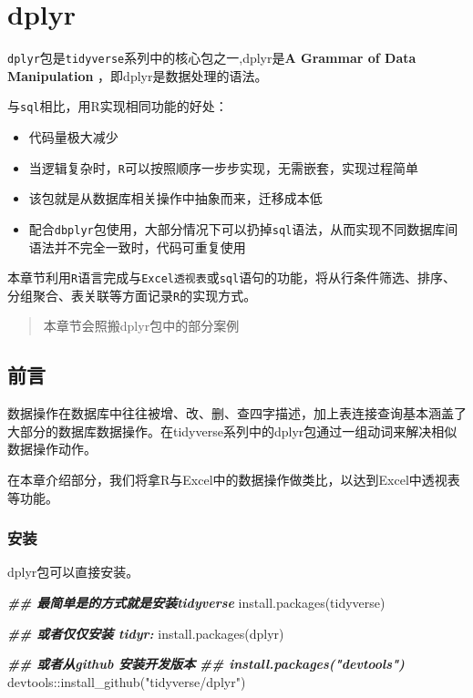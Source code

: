 \documentclass[
]{book}
\newenvironment{Shaded}{\begin{snugshade}}{\end{snugshade}}
\newcommand{\DocumentationTok}[1]{\textcolor[rgb]{0.56,0.35,0.01}{\textbf{\textit{#1}}}}
\newcommand{\FunctionTok}[1]{\textcolor[rgb]{0.00,0.00,0.00}{#1}}
\newcommand{\NormalTok}[1]{#1}
\newcommand{\SpecialCharTok}[1]{\textcolor[rgb]{0.00,0.00,0.00}{#1}}
\newcommand{\StringTok}[1]{\textcolor[rgb]{0.31,0.60,0.02}{#1}}
\begin{document}
\hypertarget{dplyr}{%
\chapter{dplyr}\label{dplyr}}

\texttt{dplyr}包是\texttt{tidyverse}系列中的核心包之一,dplyr是\textbf{A Grammar of Data Manipulation }，即dplyr是数据处理的语法。

与\texttt{sql}相比，用R实现相同功能的好处：

\begin{itemize}
\item
  代码量极大减少
\item
  当逻辑复杂时，\texttt{R}可以按照顺序一步步实现，无需嵌套，实现过程简单
\item
  该包就是从数据库相关操作中抽象而来，迁移成本低
\item
  配合\texttt{dbplyr}包使用，大部分情况下可以扔掉\texttt{sql}语法，从而实现不同数据库间语法并不完全一致时，代码可重复使用
\end{itemize}

本章节利用\texttt{R}语言完成与\texttt{Excel透视表}或\texttt{sql}语句的功能，将从行条件筛选、排序、分组聚合、表关联等方面记录\texttt{R}的实现方式。

\begin{quote}
本章节会照搬dplyr包中的部分案例
\end{quote}

\hypertarget{ux524dux8a00}{%
\section{前言}\label{ux524dux8a00}}

数据操作在数据库中往往被增、改、删、查四字描述，加上表连接查询基本涵盖了大部分的数据库数据操作。在tidyverse系列中的dplyr包通过一组动词来解决相似数据操作动作。

在本章介绍部分，我们将拿R与Excel中的数据操作做类比，以达到Excel中透视表等功能。

\hypertarget{ux5b89ux88c5-4}{%
\subsection{安装}\label{ux5b89ux88c5-4}}

dplyr包可以直接安装。

\begin{Shaded}
\begin{Highlighting}[]
\DocumentationTok{\#\# 最简单是的方式就是安装tidyverse}
\FunctionTok{install.packages}\NormalTok{(}\StringTok{\textquotesingle{}tidyverse\textquotesingle{}}\NormalTok{)}

\DocumentationTok{\#\# 或者仅仅安装 tidyr:}
\FunctionTok{install.packages}\NormalTok{(}\StringTok{\textquotesingle{}dplyr\textquotesingle{}}\NormalTok{)}

\DocumentationTok{\#\# 或者从github 安装开发版本}
\DocumentationTok{\#\# install.packages("devtools")}
\NormalTok{devtools}\SpecialCharTok{::}\FunctionTok{install\_github}\NormalTok{(}\StringTok{"tidyverse/dplyr"}\NormalTok{)}
\end{Highlighting}
\end{Shaded}
\end{document}
